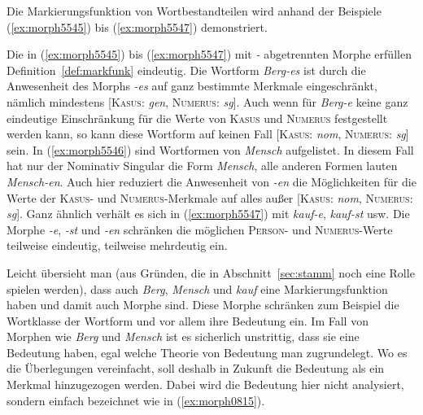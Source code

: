 Die Markierungsfunktion von Wortbestandteilen wird anhand der Beispiele (\ref{ex:morph5545}) bis (\ref{ex:morph5547}) demonstriert.

\begin{exe}
  \ex \label{ex:morph5545}
  \begin{xlist}
  \end{xlist}
  \ex \label{ex:morph5546}
  \begin{xlist}
  \end{xlist}

  \ex \label{ex:morph5547}
  \begin{xlist}
  \end{xlist}
\end{exe}

Die in (\ref{ex:morph5545}) bis (\ref{ex:morph5547}) mit \textit{-} abgetrennten Morphe erfüllen Definition~\ref{def:markfunk} eindeutig.
Die Wortform \textit{Berg-es} ist durch die Anwesenheit des Morphs \textit{-es} auf ganz bestimmte Merkmale eingeschränkt, nämlich mindestens [\textsc{Kasus}: \textit{gen}, \textsc{Numerus}: \textit{sg}].
\label{abs:4578239547}Auch wenn für \textit{Berg-e} keine ganz eindeutige Einschränkung für die Werte von \textsc{Kasus} und \textsc{Numerus} festgestellt werden kann, so kann diese Wortform \zB auf keinen Fall [\textsc{Kasus}: \textit{nom}, \textsc{Numerus}: \textit{sg}] sein.
In (\ref{ex:morph5546}) sind Wortformen von \textit{Mensch} aufgelistet.
In diesem Fall hat nur der Nominativ Singular die Form \textit{Mensch}, alle anderen Formen lauten \textit{Mensch-en}.
Auch hier reduziert die Anwesenheit von \textit{-en} die Möglichkeiten für die Werte der \textsc{Kasus}- und \textsc{Numerus}-Merkmale auf alles außer [\textsc{Kasus}: \textit{nom}, \textsc{Numerus}: \textit{sg}].
Ganz ähnlich verhält es sich in (\ref{ex:morph5547}) mit \textit{kauf-e}, \textit{kauf-st} usw.
Die Morphe \textit{-e}, \textit{-st} und \textit{-en} schränken die möglichen \textsc{Person}- und \textsc{Numerus}-Werte teilweise eindeutig, teilweise mehrdeutig ein.

Leicht übersieht man (aus Gründen, die in Abschnitt~\ref{sec:stamm} noch eine Rolle spielen werden), dass auch \textit{Berg}, \textit{Mensch} und \textit{kauf} eine Markierungsfunktion haben und damit auch Morphe sind.
Diese Morphe schränken zum Beispiel die Wortklasse der Wortform und vor allem ihre Bedeutung ein.
Im Fall von Morphen wie \textit{Berg} und \textit{Mensch} ist es sicherlich unstrittig, dass sie eine Bedeutung haben, egal welche Theorie von Bedeutung man zugrundelegt.
Wo es die Überlegungen vereinfacht, soll deshalb in Zukunft die Bedeutung als ein Merkmal hinzugezogen werden.
Dabei wird die Bedeutung hier nicht analysiert, sondern einfach bezeichnet wie in (\ref{ex:morph0815}).

